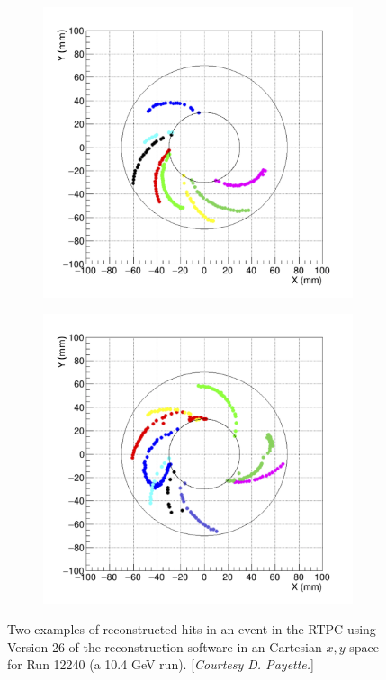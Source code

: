 \begin{figure}[h!]
	\centering
	\begin{subfigure}[b]{0.44\linewidth}
		\includegraphics[width=\linewidth]{figures/RTPC_tracks_12240_1.png}
	\end{subfigure}
	\begin{subfigure}[b]{0.44\textwidth}
		\includegraphics[width=\linewidth]{figures/RTPC_tracks_12240_2.png}
	\end{subfigure}
	\caption{Two examples of reconstructed hits in an event in the RTPC using Version 26 of the reconstruction software in an Cartesian $x,y$ space for Run 12240 (a 10.4 GeV run). [\textit{Courtesy D. Payette.}]}
	\label{fig:rtpc_tracks_12240}
\end{figure}

